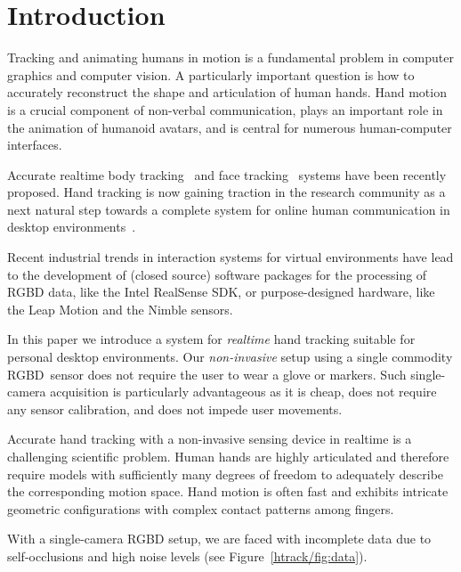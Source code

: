 

\section{Introduction}

Tracking and animating humans in motion is a fundamental problem in computer graphics and computer vision. A particularly important question is how to accurately reconstruct the shape and articulation of human hands. Hand motion is a crucial component of non-verbal communication, plays an important role in the animation of humanoid avatars, and is central for numerous human-computer interfaces. 

Accurate realtime body tracking~\cite{shotton_cvpr11,wei_siga12} and face tracking~\cite{cao_sig14} systems have been recently proposed. Hand tracking is now gaining traction in the research community as a next natural step towards a complete system for online human communication in desktop environments~\cite{oiko_bmvc11,melax_13,sridhar_14,schroeder_icra14,tompson_tog14}.

Recent industrial trends in interaction systems for virtual environments have lead to the development of (closed source) software packages for the processing of RGBD data, like the Intel RealSense SDK, or purpose-designed hardware, like the Leap Motion and the Nimble sensors. 


In this paper we introduce a system for \emph{realtime} hand tracking suitable for personal desktop environments. Our \emph{non-invasive} setup using a single commodity RGBD~sensor does not require the user to wear a glove or markers. 
Such single-camera acquisition is particularly advantageous as it is cheap, does not require any sensor calibration, and does not impede user movements. 

Accurate hand tracking with a non-invasive sensing device in realtime is a challenging scientific problem. Human hands are highly articulated and therefore require models with sufficiently many degrees of freedom to adequately describe the corresponding motion space. Hand motion is often fast and exhibits intricate geometric configurations with complex contact patterns among fingers. 

With a single-camera RGBD setup, we are faced with incomplete data due to self-occlusions and high noise levels (see Figure~\ref{htrack/fig:data}).

